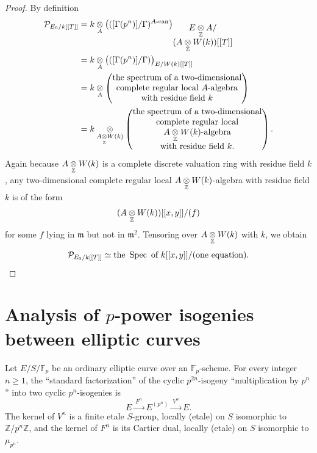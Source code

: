 \begin{proof}
By definition
\begin{align*}
\mathcal{P}_{E_0/k[[T]]} &= k \underset{A}{\otimes} \bigl( ([\Gamma(p^n)]/\Gamma)^{A\text{-\rm can}} \bigr)_{\substack{\textstyle E \underset{\mathbb{Z}}{\otimes} A / \\ \textstyle (A \underset{\mathbb{Z}}{\otimes} W(k))[[T]]}} \\
&= k \underset{A}{\otimes} \bigl( ([\Gamma(p^n)]/\Gamma) \bigr)_{E / W(k)[[T]]} \\
&= k \underset{A}{\otimes} \begin{pmatrix}
\text{the spectrum of a two-dimensional} \\
\text{complete regular local } A\text{-algebra} \\
\text{with residue field } k
\end{pmatrix} \\
&= k \underset{A \underset{\mathbb{Z}}{\otimes} W(k)}{\otimes} \begin{pmatrix}
\text{the spectrum of a two-dimensional} \\
\text{complete regular local} \\
A \underset{\mathbb{Z}}{\otimes} W(k)\text{-algebra} \\
\text{with residue field } k .
\end{pmatrix} .
\end{align*}
Again because $A \underset{\mathbb{Z}}{\otimes} W(k)$ is a complete discrete valuation ring with residue field $k$, any two-dimensional complete regular local $A \underset{\mathbb{Z}}{\otimes} W(k)$-algebra with residue field $k$ is of the form
\[
(A \underset{\mathbb{Z}}{\otimes} W(k))[[x, y]]/(f)
\]
for some $f$ lying in $\mathfrak{m}$ but not in $\mathfrak{m}^2$. Tensoring over $A \underset{\mathbb{Z}}{\otimes} W(k)$ with $k$, we obtain
\[
\mathcal{P}_{E_0/k[[T]]} \simeq \text{the } \operatorname{Spec} \text{ of } k[[x, y]]/(\text{one equation}) . \qedhere
\]
\end{proof}

\section{Analysis of \texorpdfstring{$p$}{p}-power isogenies between elliptic curves}
\label{sec:13.3}

\begin{kprop}\label{prop:13.3.1}
Let $E/S/\mathbb{F}_p$ be an ordinary elliptic curve over an $\mathbb{F}_p$-scheme. For every integer $n \ge 1$, the ``standard factorization'' of the cyclic $p^{2n}$-isogeny ``multiplication by $p^n$'' into two cyclic $p^n$-isogenies is
\[
E \xrightarrow{\ F^n\ } E^{(p^n)} \xrightarrow{\ V^n\ } E .
\]
The kernel of $V^n$ is a finite etale $S$-group, locally (etale) on $S$ isomorphic to $\mathbb{Z}/p^n\mathbb{Z}$, and the kernel of $F^n$ is its Cartier dual, locally (etale) on $S$ isomorphic to $\mu_{p^n}$.
\end{kprop}

